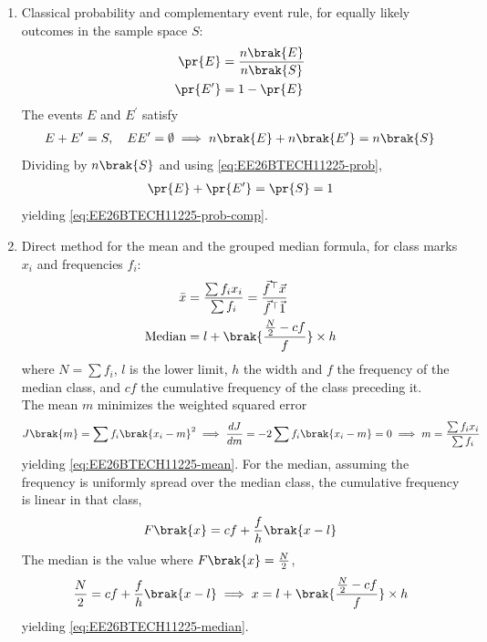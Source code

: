 \begin{enumerate}[label=\thesubsection.\arabic*, ref=\thesubsection.\theenumi]
\item Classical probability and complementary event rule, for equally likely outcomes in the sample space $S$:
\begin{align}
	\pr{E} &= \frac{n\brak{E}}{n\brak{S}}
	\label{eq:EE26BTECH11225-prob}
	\\
	\pr{E^{\prime}} &= 1 - \pr{E}
	\label{eq:EE26BTECH11225-prob-comp}
\end{align}
\solution
The events $E$ and $E^{\prime}$ satisfy
\begin{align}
	E + E^{\prime} = S, \quad EE^{\prime} = \emptyset
	\implies n\brak{E} + n\brak{E^{\prime}} = n\brak{S}
\end{align}
Dividing by $n\brak{S}$ and using \eqref{eq:EE26BTECH11225-prob},
\begin{align}
	\pr{E} + \pr{E^{\prime}} = \pr{S} = 1
\end{align}
yielding \eqref{eq:EE26BTECH11225-prob-comp}.

\item Direct method for the mean and the grouped median formula, for class marks $x_i$ and frequencies $f_i$:
\begin{align}
	\bar{x} &= \frac{\sum f_i x_i}{\sum f_i} = \frac{\vec{f}^{\top}\vec{x}}{\vec{f}^{\top}\vec{1}}
	\label{eq:EE26BTECH11225-mean}
	\\
	\text{Median} &= l + \brak{\frac{\frac{N}{2} - cf}{f}} \times h
	\label{eq:EE26BTECH11225-median}
\end{align}
where $N = \sum f_i$, $l$ is the lower limit, $h$ the width and $f$ the frequency of the median class, and $cf$ the cumulative frequency of the class preceding it.
\\
\solution
The mean $m$ minimizes the weighted squared error
\begin{align}
	J\brak{m} = \sum f_i\brak{x_i - m}^2
	\implies \frac{dJ}{dm} = -2\sum f_i\brak{x_i - m} = 0
	\implies m = \frac{\sum f_i x_i}{\sum f_i}
\end{align}
yielding \eqref{eq:EE26BTECH11225-mean}. For the median, assuming the frequency is uniformly spread over the median class, the cumulative frequency is linear in that class,
\begin{align}
	F\brak{x} = cf + \frac{f}{h}\brak{x - l}
\end{align}
The median is the value where $F\brak{x} = \frac{N}{2}$,
\begin{align}
	\frac{N}{2} = cf + \frac{f}{h}\brak{x - l}
	\implies x = l + \brak{\frac{\frac{N}{2} - cf}{f}} \times h
\end{align}
yielding \eqref{eq:EE26BTECH11225-median}.

\end{enumerate}
